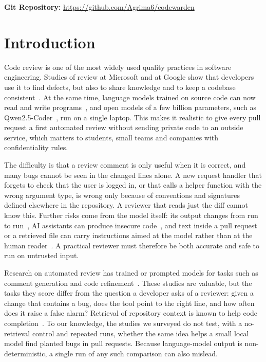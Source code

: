 \documentclass[12pt,onecolumn,draftclsnofoot]{IEEEtran}
\begin{document}
\noindent\textbf{Git Repository:} \url{https://github.com/Agrima6/codewarden}

\section{Introduction}
Code review is one of the most widely used quality practices in software engineering. Studies of review at Microsoft and at Google show that developers use it to find defects, but also to share knowledge and to keep a codebase consistent~\cite{bacchelli2013expectations,sadowski2018modern}. At the same time, language models trained on source code can now read and write programs~\cite{chen2021codex,roziere2023codellama}, and open models of a few billion parameters, such as Qwen2.5-Coder~\cite{hui2024qwen}, run on a single laptop. This makes it realistic to give every pull request a first automated review without sending private code to an outside service, which matters to students, small teams and companies with confidentiality rules.

The difficulty is that a review comment is only useful when it is correct, and many bugs cannot be seen in the changed lines alone. A new request handler that forgets to check that the user is logged in, or that calls a helper function with the wrong argument type, is wrong only because of conventions and signatures defined elsewhere in the repository. A reviewer that reads just the diff cannot know this. Further risks come from the model itself: its output changes from run to run~\cite{ouyang2023nondeterminism}, AI assistants can produce insecure code~\cite{pearce2022asleep,perry2023insecure}, and text inside a pull request or a retrieved file can carry instructions aimed at the model rather than at the human reader~\cite{greshake2023indirect,perez2022ignore}. A practical reviewer must therefore be both accurate and safe to run on untrusted input.

Research on automated review has trained or prompted models for tasks such as comment generation and code refinement~\cite{tufano2021towards,li2022codereviewer,lu2023llamareviewer,guo2023chatgpt,tang2024codeagent}. These studies are valuable, but the tasks they score differ from the question a developer asks of a reviewer: given a change that contains a bug, does the tool point to the right line, and how often does it raise a false alarm? Retrieval of repository context is known to help code completion~\cite{zhang2023repocoder,ding2023crosscodeeval}. To our knowledge, the studies we surveyed do not test, with a no-retrieval control and repeated runs, whether the same idea helps a small local model find planted bugs in pull requests. Because language-model output is non-deterministic, a single run of any such comparison can also mislead.
\end{document}
